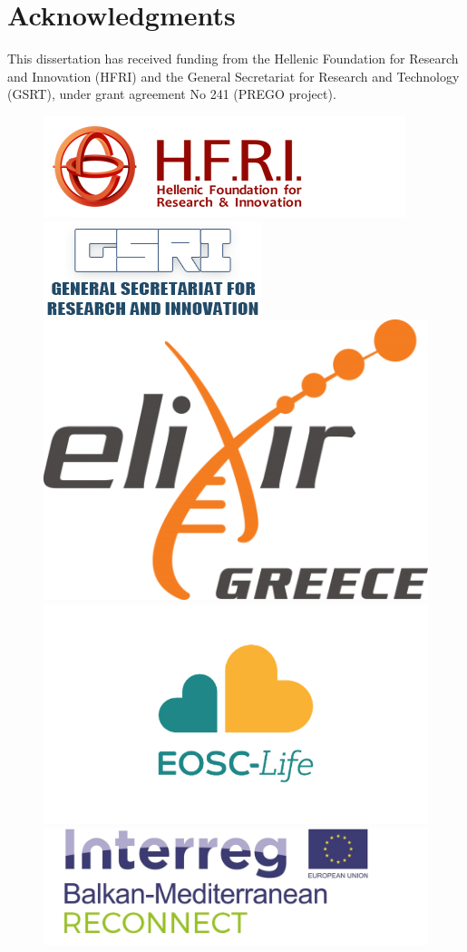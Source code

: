 % 
% 

\chapter*{Acknowledgments}
\label{acknowledge}


This dissertation has received funding from the Hellenic Foundation 
for Research and Innovation (HFRI) and the General Secretariat for Research 
and Technology (GSRT), under grant agreement No 241 (PREGO project).

\bigskip\bigskip

\begin{figure}[!h]
   \centering
   \begin{minipage}{\textwidth}
     \centering
     \includegraphics[width=.55\textwidth]{figures/elidek_logo_en.png}
     \includegraphics[width=.35\textwidth]{figures/gsri_logo_v2-en.png}
     \includegraphics[width=.35\textwidth]{figures/elixir_greece_white_background.png}
     \includegraphics[width=.55\textwidth]{figures/EOSC life_0.png}
     \includegraphics[width=.65\textwidth]{figures/Acronym_Environment_RECONNECT_transp.png}

\end{minipage}
\end{figure}
